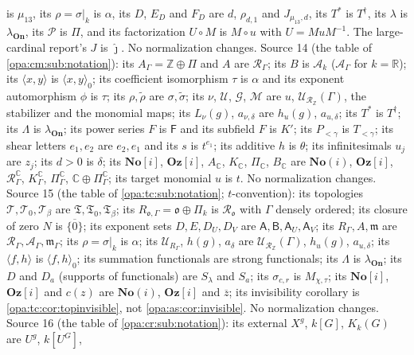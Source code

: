 \documentclass[11pt,oneside]{article}
\numberwithin{equation}{section}
\theoremstyle{definition}
\theoremstyle{remark}
\newcommand{\No}{\mathbf{No}}
\newcommand{\Oz}{\mathbf{Oz}}
\newcommand{\Og}{\mathbf{Oz}[i]}
\newcommand{\SC}{\mathbf{No}(i)}
\newcommand{\R}{\mathbb R}
\newcommand{\C}{\mathbb C}
\newcommand{\Z}{\mathbb Z}
\newcommand{\oo}{\mathfrak o}
\newcommand{\Ak}{\mathcal A_k}
\newcommand{\Ro}{\mathcal R_{\oo}}
\newcommand{\mm}{\mathfrak m}
\newcommand{\UU}{\mathcal U}
\newcommand{\pairing}[2]{\langle #1,#2\rangle_0}
\newcommand{\On}{\mathbf{On}}
\begin{document}
is $\mu_{13}$, its $\rho=\sigma|_k$ is $\alpha$, its $D$, $E_D$ and $F_D$ are $d$, $\rho_{d,1}$ and
$J_{\mu_{13},d}$, its $T^*$ is $T^\dagger$, its $\lambda$ is $\lambda_{\On}$, its $\mathcal P$ is
$\Pi$, and its factorization $U\circ M$ is $M\circ u$ with $U=MuM^{-1}$. The large-cardinal
report's $J$ is $\hat\jmath$. No normalization changes.
Source 14 (the table of \cref{opa:cm:sub:notation}): its $A_\Gamma=\Z\oplus\Pi$ and $A$ are
$\mathcal R_\Gamma$; its $B$ is $\Ak$ ($\mathcal A_\Gamma$ for $k=\R$); its $\langle x,y\rangle$ is
$\pairing xy$; its coefficient isomorphism $\tau$ is $\alpha$ and its exponent automorphism
$\phi$ is $\tau$; its $\rho,\widetilde\rho$ are $\sigma,\widetilde\sigma$; its $\nu$, $\mathcal U$,
$\mathcal G$, $\mathcal M$ are $u$, $\UU_{\mathcal R_\Z}(\Gamma)$, the stabilizer and the monomial maps;
its $L_\nu(g)$, $a_{\nu,\delta}$ are $h_u(g)$, $a_{u,\delta}$; its $T^*$ is $T^\dagger$; its $\Lambda$
is $\lambda_{\On}$; its power series $F$ is $\mathsf F$ and its subfield $F$ is $K'$; its $P_{<\gamma}$
is $T_{<\gamma}$; its shear letters $e_1,e_2$ are $e_2,e_1$ and its $s$ is $t^{e_1}$; its additive
$h$ is $\theta$; its infinitesimals $u_j$ are $z_j$; its $d>0$ is $\delta$; its $\mathbf{No}[i]$, $\mathbf{Oz}[i]$, $A_\C$, $K_\C$, $\Pi_\C$, $B_\C$ are $\SC$, $\Og$,
$\mathcal R^\C_\Gamma$, $K^\C_\Gamma$, $\Pi^\C_\Gamma$, $\C\oplus\Pi^\C_\Gamma$; its target monomial $u$ is
$t$. No normalization changes.
Source 15 (the table of \cref{opa:tc:sub:notation}; $t$-convention): its topologies $\mathcal T,\mathcal T_0,\mathcal T_\beta$
are $\mathfrak T,\mathfrak T_0,\mathfrak T_\beta$; its $R_{\mathfrak o,\Gamma}=\mathfrak o\oplus\Pi_k$ is $\Ro$ with $\Gamma$
densely ordered; its closure of zero $N$ is $\overline{\{0\}}$; its exponent sets $D,E,D_U,D_V$ are
$\mathsf A,\mathsf B,\mathsf A_U,\mathsf A_V$; its $R_\Gamma,A,\mm$ are $\mathcal R_\Gamma,\mathcal A_\Gamma,\mm_\Gamma$; its
$\rho=\sigma|_k$ is $\alpha$; its $\mathcal U_{R_\Gamma}$, $h(g)$, $a_\delta$ are $\UU_{\mathcal R_\Z}(\Gamma)$, $h_u(g)$,
$a_{u,\delta}$; its $\langle f,h\rangle$ is $\pairing fh$; its summation functionals are strong functionals; its
$\Lambda$ is $\lambda_{\On}$; its $D$ and $D_a$ (supports of functionals) are $S_\lambda$ and $S_a$; its
$\sigma_{c,r}$ is $M_{\chi,\tau}$; its $\No[i]$, $\Oz[i]$ and $c(z)$ are $\SC$, $\Og$ and $\overline z$; its
invisibility corollary is \cref{opa:tc:cor:topinvisible}, not \cref{opa:as:cor:invisible}. No normalization
changes.
Source 16 (the table of \cref{opa:cr:sub:notation}): its external $X^g$, $k[G]$, $K_k(G)$ are $U^g$, $k[U^G]$,
\end{document}
